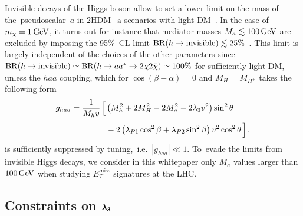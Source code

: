 \documentclass[a4paper, 11pt,notoc]{article}
\newcommand{\MET}{\ensuremath{E_T^\mathrm{miss}}\xspace}
\newcommand{\hdma}{\ensuremath{\textrm{2HDM+a}}\xspace}
\def\bm#1{\mbox{\boldmath$#1$\unboldmath}}
\begin{document}
Invisible decays of the Higgs boson allow to set a lower limit on the mass of  the~pseudoscalar~$a$ in \hdma scenarios with light DM~\cite{Bauer:2017ota}. In the case of $m_\chi = 1 \, {\rm GeV}$, it turns out for instance that mediator masses $M_a \lesssim 100 \, {\rm GeV}$ are excluded by imposing the 95\%~CL limit ${\rm BR} (h \to  \text{invisible}) \lesssim 25\%$~\cite{Aad:2015pla,Khachatryan:2016whc}.  This limit is largely independent of the choices of the other parameters since ${\rm BR} (h \to  \text{invisible}) \simeq {\rm BR} (h \to a a^\ast \to 2 \chi 2 \bar \chi) \simeq 100\%$ for sufficiently light DM, unless  the $haa$ coupling, which for $\cos (\beta-\alpha) = 0$ and $M_H = M_{H^\pm}$ takes the following form~\cite{Bauer:2017ota}
\begin{equation}
\begin{split}
g_{haa} & = \frac{1}{M_h v}  \, \Big [ \left ( M_h^2  + 2 M_H^2  -  2 M_a^2 - 2 \lambda_3 v^2 \right) \sin^2 \theta \\[1mm] &  \hspace{1.5cm} - 2 \left (  \lambda_{P1} \cos^2 \beta + \lambda_{P2} \sin^2 \beta  \right ) v^2 \cos^2 \theta \, \Big ]  \,, 
\end{split}
\end{equation}
is sufficiently suppressed by tuning,~i.e.~$|g_{haa}| \ll 1$. To~evade the limits from invisible Higgs decays, we consider in this whitepaper only $M_a$ values larger than $100 \, {\rm GeV}$ when studying $\MET$ signatures at the LHC. 

\subsection*{Constraints on $\bm{\lambda_3}$}
\end{document}
